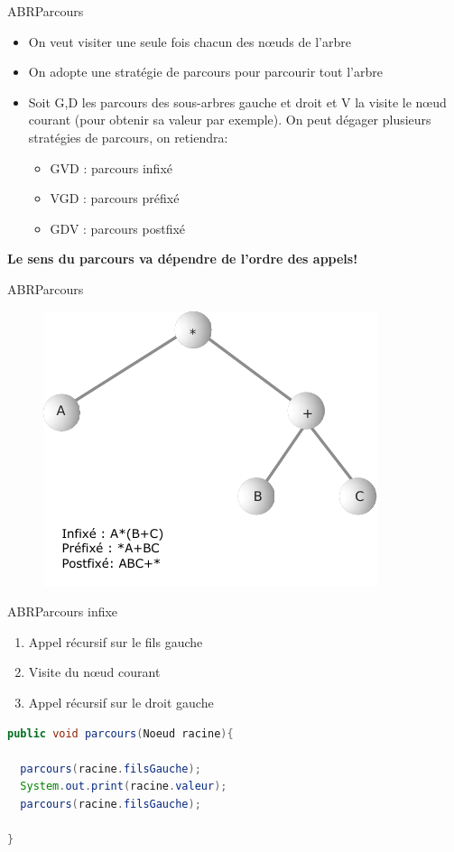 \documentclass[12pt,a4paper]{beamer}
\begin{document}
\begin{frame}{ABR}{Parcours}

\begin{itemize}
\item On veut visiter une seule fois chacun des n\oe uds de l'arbre
\item On adopte une stratégie de parcours pour parcourir tout l'arbre
\item Soit G,D les parcours des sous-arbres gauche et droit et V la visite le n\oe ud courant (pour obtenir sa valeur par exemple). On peut dégager plusieurs stratégies de parcours, on retiendra:
\begin{itemize}
\item GVD : parcours infixé
\item VGD : parcours préfixé
\item GDV : parcours postfixé
\end{itemize}
\end{itemize}
\hspace{-2em} \textbf{Le sens du parcours va dépendre de l'ordre des appels!
}\end{frame}

\begin{frame}{ABR}{Parcours}
\begin{figure}
\includegraphics[scale=1]{figs/traversing_tree}
\end{figure}
\end{frame}

\begin{frame}[fragile]{ABR}{Parcours infixe}
\begin{enumerate}
\item Appel récursif sur le fils gauche
\item Visite du n\oe ud courant
\item Appel récursif sur le droit gauche
\end{enumerate}

\begin{lstlisting}[language=Java]
public void parcours(Noeud racine){

  parcours(racine.filsGauche);
  System.out.print(racine.valeur);
  parcours(racine.filsGauche);
  
}
\end{lstlisting}

\end{frame}
\end{document}
